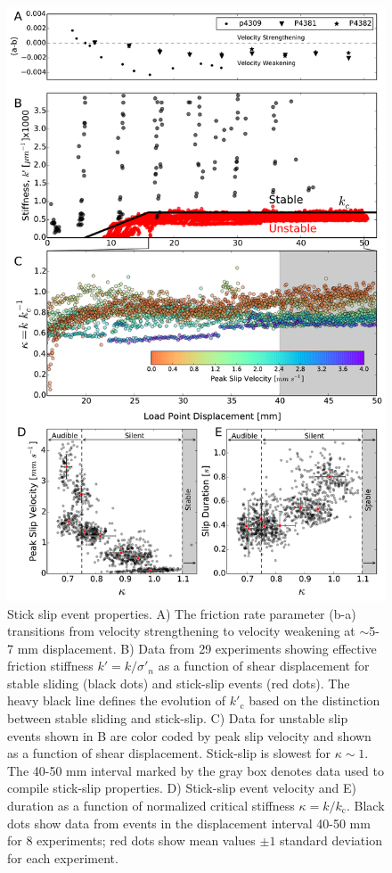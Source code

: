 \begin{figure}
	\centering
		\includegraphics[scale=0.4]{chap_lab_slow_eq/Figure_3.pdf}
   	\caption{Stick slip event properties. A) The friction rate parameter (b-a) transitions from velocity strengthening 
to velocity weakening at $\sim$5-7 mm displacement.  B) Data from 29 experiments showing effective friction stiffness $k'=k/\sigma'_n$ as a function of shear displacement for stable sliding (black dots) and stick-slip events (red dots). The heavy black line defines the evolution of $k'_\text{c}$ based on the distinction between stable sliding and stick-slip. C) Data for unstable slip events shown in B are color coded by peak slip velocity and shown as a function of shear displacement. Stick-slip is slowest for $\kappa \sim 1$. The 40-50 mm interval marked by the gray box denotes data used to compile stick-slip properties. D) Stick-slip event velocity and E) duration as a function of normalized critical stiffness $\kappa = k/k_\text{c}$.  Black dots show data from events in the displacement interval 40-50 mm for 8 experiments; red dots show mean values $\pm 1$ standard deviation for each experiment.}
  	\label{Figure_3}
\end{figure}


